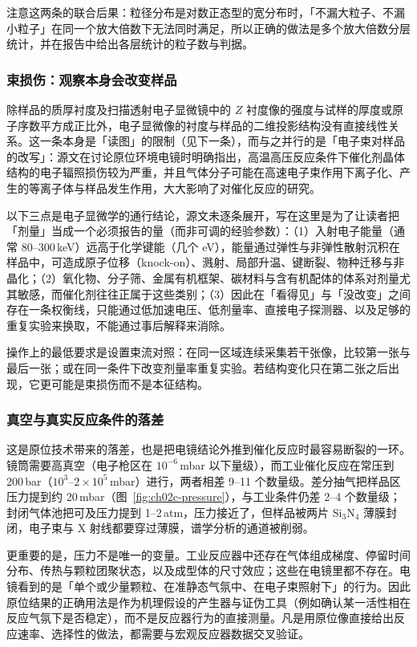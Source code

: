 注意这两条的联合后果：粒径分布是对数正态型的宽分布时，「不漏大粒子、不漏小粒子」在同一个放大倍数下无法同时满足，所以正确的做法是多个放大倍数分层统计，并在报告中给出各层统计的粒子数与判据。

\subsubsection{束损伤：观察本身会改变样品}

除样品的质厚衬度及扫描透射电子显微镜中的 $Z$ 衬度像的强度与试样的厚度或原子序数平方成正比外，电子显微像的衬度与样品的二维投影结构没有直接线性关系。这一条本身是「读图」的限制（见下一条），而与之并行的是「电子束对样品的改写」：源文在讨论原位环境电镜时明确指出，高温高压反应条件下催化剂晶体结构的电子辐照损伤较为严重，并且气体分子可能在高速电子束作用下离子化、产生的等离子体与样品发生作用，大大影响了对催化反应的研究。

以下三点是电子显微学的通行结论，源文未逐条展开，写在这里是为了让读者把「剂量」当成一个必须报告的量（而非可调的经验参数）：（1）入射电子能量（通常 80--300\,keV）远高于化学键能（几个 eV），能量通过弹性与非弹性散射沉积在样品中，可造成原子位移（knock-on）、溅射、局部升温、键断裂、物种迁移与非晶化；（2）氧化物、分子筛、金属有机框架、碳材料与含有机配体的体系对剂量尤其敏感，而催化剂往往正属于这些类别；（3）因此在「看得见」与「没改变」之间存在一条权衡线，只能通过低加速电压、低剂量率、直接电子探测器、以及足够的重复实验来换取，不能通过事后解释来消除。

操作上的最低要求是设置束流对照：在同一区域连续采集若干张像，比较第一张与最后一张；或在同一条件下改变剂量率重复实验。若结构变化只在第二张之后出现，它更可能是束损伤而不是本征结构。

\subsubsection{真空与真实反应条件的落差}

这是原位技术带来的落差，也是把电镜结论外推到催化反应时最容易断裂的一环。镜筒需要高真空（电子枪区在 $10^{-6}$\,mbar 以下量级），而工业催化反应在常压到 200\,bar（$10^{3}$--$2\times10^{5}$\,mbar）进行，两者相差 9--11 个数量级。差分抽气把样品区压力提到约 20\,mbar（图~\ref{fig:ch02c-pressure}），与工业条件仍差 2--4 个数量级；封闭气体池把可及压力提到 1--2\,atm，压力接近了，但样品被两片 Si$_3$N$_4$ 薄膜封闭，电子束与 X 射线都要穿过薄膜，谱学分析的通道被削弱。

更重要的是，压力不是唯一的变量。工业反应器中还存在气体组成梯度、停留时间分布、传热与颗粒团聚状态，以及成型体的尺寸效应；这些在电镜里都不存在。电镜看到的是「单个或少量颗粒、在准静态气氛中、在电子束照射下」的行为。因此原位结果的正确用法是作为机理假设的产生器与证伪工具（例如确认某一活性相在反应气氛下是否稳定），而不是反应器行为的直接测量。凡是用原位像直接给出反应速率、选择性的做法，都需要与宏观反应器数据交叉验证。

